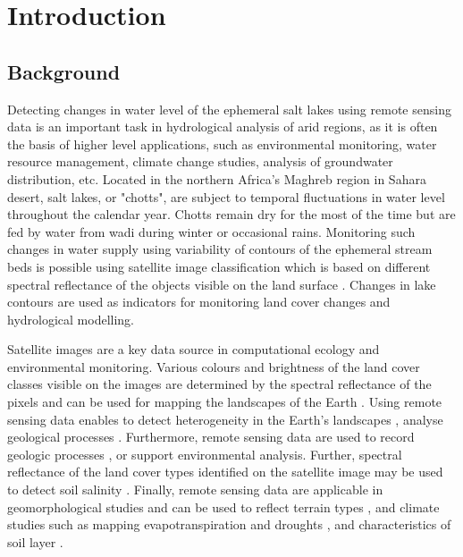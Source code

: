 \documentclass[asi,article,submit,pdftex,moreauthors]{Definitions/mdpi}
\begin{document}
\section{Introduction}

\subsection{Background}
Detecting changes in water level of the ephemeral salt lakes using remote sensing data is an important task in hydrological analysis of arid regions, as it is often the basis of higher level applications, such as environmental monitoring, water resource management, climate change studies, analysis of groundwater distribution, etc. Located in the northern Africa's Maghreb region in Sahara desert, salt lakes, or "chotts", are subject to temporal fluctuations in water level throughout the calendar year. Chotts remain dry for the most of the time but are fed by water from wadi during winter or occasional rains. Monitoring such changes in water supply using variability of contours of the ephemeral stream beds is possible using satellite image classification which is based on different spectral reflectance of the objects visible on the land surface \cite{Medjani}. Changes in lake contours are used as indicators for monitoring land cover changes and hydrological modelling. 

Satellite images are a key data source in computational ecology and environmental monitoring. Various colours and brightness of the land cover classes visible on the images are determined by the spectral reflectance of the pixels and can be used for mapping the landscapes of the Earth \cite{Takorabt,Laghouag,Lemenkova202021,Lemenkova202205,Amri}. Using remote sensing data enables to detect heterogeneity in the Earth's landscapes \cite{Abbas}, analyse geological processes  \cite{ARAIBIA2022104455,LAMRI2016143}. Furthermore, remote sensing data are used to record geologic processes \cite{Deroin2019,data7060074}, or support environmental analysis. Further, spectral reflectance of the land cover types identified on the satellite image may be used to detect soil salinity \cite{abdennour2019detection}. Finally, remote sensing data are applicable in geomorphological studies and can be used to reflect terrain types \cite{Rebillard,Lemenkova202127,Lemenkova202105}, and climate studies such as mapping evapotranspiration and droughts \cite{ijgi11090473}, and characteristics of soil layer \cite{MULDER20111}.  
\end{document}
